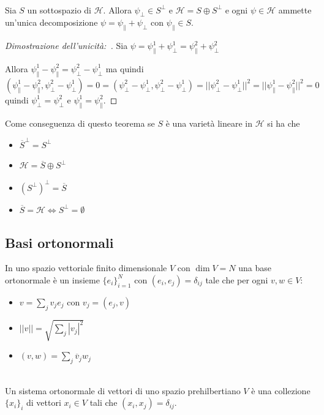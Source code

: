 \documentclass[11pt,a4paper,twoside]{book}
\newenvironment{teorema}[1][\empty]{\begin{Teorema}{
\ifx\empty#1\relax\else\mdseries\itshape#1\\\fi
}{}}{\end{Teorema}}
\newenvironment{definizione}[1][\empty]{\begin{Definizione}{
\ifx\empty#1\relax\else\mdseries\itshape#1\\\fi
}{}}{\end{Definizione}}
\newenvironment{dimo}[1][\proofname]{
	\begin{tcolorbox}[
	breakable, 
	enhanced, 
	interior hidden, 
	frame hidden, 
	borderline west = {1pt}{0pt}{gray}, 
	top=0pt, bottom=0pt, left=0pt]
\begin{proof}[#1:~]
}
{
\end{proof}
\end{tcolorbox}
}
\theoremstyle{esss}
\theoremstyle{dotless}
\numberwithin{equation}{section} %
\begin{document}
\begin{teorema}
Sia $S$ un sottospazio di $\mathcal{H}$. Allora $\psi_\perp\in S^\perp$ e $\mathcal{H}=S\oplus S^\perp$ e ogni $\psi\in\mathcal{H}$ ammette un'unica decomposizione $\psi=\psi_\parallel+\psi_\perp$ con $\psi_\parallel\in S$. 
\end{teorema}

\begin{dimo}[Dimostrazione dell'unicità]
Sia $\psi=\psi_\parallel^1+\psi_\perp^1=\psi_\parallel^2+\psi_\perp^2$ 

Allora $\psi_\parallel^1-\psi_\parallel^2=\psi_\perp^2-\psi_\perp^1$ ma quindi $\left(\psi_\parallel^1-\psi_\parallel^2,\psi_\perp^2-\psi_\perp^1\right)=0=\left(\psi_\perp^2-\psi_\perp^1,\psi_\perp^2-\psi_\perp^1\right)=||\psi_\perp^2-\psi_\perp^1||^2=||\psi_\parallel^1-\psi_\parallel^2||^2=0$ quindi $\psi_\perp^1=\psi_\perp^2$ e $\psi_\parallel^1=\psi_\parallel^2$.\qedhere 

\end{dimo}

Come conseguenza di questo teorema se $S$ è una varietà lineare in $\mathcal{H}$ si ha che\begin{itemize}[label=$\cdot$]\item $\overline{S}^\perp=S^\perp$ \item $\mathcal{H}=\overline{S}\oplus S^\perp$ \item $\left(S^\perp\right)^\perp=\overline{S}$ \item $\overline{S}=\mathcal{H} \iff S^\perp=\emptyset $\end{itemize}

\subsection{Basi ortonormali}

In uno spazio vettoriale finito dimensionale $V$ con $\dim V=N$ una base ortonormale è un insieme $\{e_i\}_{i=1}^N$ con $(e_i,e_j)=\delta_{ij}$ tale che per ogni $v,w\in V$:\begin{itemize}[label=$\cdot$]
\item $v=\sum_j v_j e_j$ con $v_j=(e_j,v)$
\item $||v||=\sqrt{\sum_j |v_j|^2}$
\item $(v,w)=\sum_j \overline{v}_j w_j$
\end{itemize}

\begin{definizione}Un sistema ortonormale di vettori di uno spazio prehilbertiano $V$ è una collezione $\{x_i\}_i$ di vettori $x_i\in V$ tali che $(x_i,x_j)=\delta_{ij}$.
\end{definizione}
\end{document}
